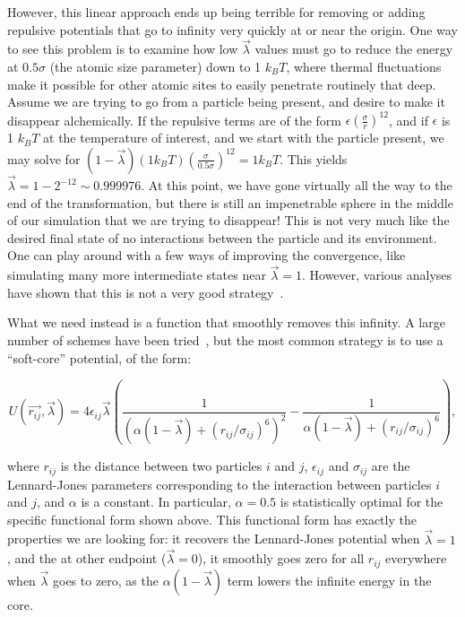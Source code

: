\documentclass[9pt,bestpractices]{livecoms}
\begin{document}
However, this linear approach ends up being terrible for removing or adding repulsive potentials that go to infinity very quickly at or near the origin. One way to see this problem is to examine how low $\vec{\lambda}$ values must go to reduce the energy at $0.5\sigma$ (the atomic size parameter) down to 1 $k_BT$, where thermal fluctuations make it possible for other atomic sites to easily penetrate routinely that deep. Assume we are trying to go from a particle being present, and desire to make it disappear alchemically. If the repulsive terms are of the form $\epsilon(\frac{\sigma}{r})^{12}$, and if $\epsilon$ is 1 $k_BT$ at the temperature of interest, and we start with the particle present, we may solve for $(1-\vec{\lambda})(1 k_B T)\left(\frac{\sigma}{0.5\sigma}\right)^{12} = 1 k_B T$. This yields $\vec{\lambda} = 1-2^{-12} \sim 0.999976$. At this point,  we have gone virtually all the way to the end of the transformation, but there is still an impenetrable sphere in the middle of our simulation that we are trying to disappear! This is not very much like the desired final state of no interactions between the particle and its environment. One can play around with a few ways of improving the convergence, like simulating many more intermediate states near $\vec{\lambda}=1$. However, various analyses have shown that this is not a very good strategy~\cite{pham2011identifying, beutler1994avoiding, zacharias1994separationshifted, blondel2004ensemble, gapsys2012new}.

What we need instead is a function that smoothly removes this infinity. A large number of schemes have been tried~\cite{beutler1994avoiding, zacharias1994separationshifted, blondel2004ensemble, pham2011identifying, pham2012optimal, naden2014linear, donnini2005incorporating,isthereagapsysone?}, but the most common strategy is to use a ``soft-core'' potential, of the form:

\begin{equation}
    U(\vec{r_{ij}},\vec{\lambda}) = 4\epsilon_{ij} \vec{\lambda} \left(\frac{1}{(\alpha(1-\vec{\lambda}) + (r_{ij}/\sigma_{ij})^6)^2} -  \frac{1}{\alpha(1-\vec{\lambda}) + (r_{ij}/\sigma_{ij})^6}\right)
    \label{eq:softcore},
\end{equation}

where $r_{ij}$ is the distance between two particles $i$ and $j$, $\epsilon_{ij}$ and $\sigma_{ij}$ are the Lennard-Jones parameters corresponding to the interaction between particles $i$ and $j$, and $\alpha$ is a constant. In particular, $\alpha=0.5$ is statistically optimal for the specific functional form shown above. This functional form has exactly the properties we are looking for: it recovers the Lennard-Jones potential when $\vec{\lambda}=1$, and the at other endpoint ($\vec{\lambda}=0$), it smoothly goes zero for all $r_{ij}$ everywhere when $\vec{\lambda}$ goes to zero, as the $\alpha(1-\vec{\lambda})$ term lowers the infinite energy in the core. 
\end{document}
